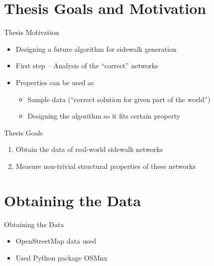 \documentclass{beamer}
\author[\FirstNameAbbreviated. \LastName]{\FirstName{} \LastName{} \\{\small \Supervisor}}
\title{\DissertationTitle}
\institute[\FacultyAndUniversityAbbr]{\Department\\ \Faculty\\ \University\\}
\date{June 26, 2024}
\begin{document}
\begin{frame}
\titlepage
\end{frame}

\section{Thesis Goals and Motivation}
\begin{frame}{Thesis Motivation}

\begin{itemize}
    \item Designing a future algorithm for sidewalk generation
    \item First step – Analysis of the “correct” networks
    \item Properties can be used as
    \begin{itemize} 
        \item Sample data (“correct solution for given part of the world”)
        \item Designing the algorithm so it fits certain property
    \end{itemize}
\end{itemize}


\end{frame}
\begin{frame}{Thesis Goals}

\begin{enumerate}
    \item Obtain the data of real-world sidewalk networks
    \item Measure non-trivial structural properties of these networks 
\end{enumerate}

\end{frame}

\section{Obtaining the Data}
\begin{frame}[fragile]{Obtaining the Data}
    \begin{itemize}
        \item OpenStreetMap data used
        \item Used Python package OSMnx
    \end{itemize}
\end{frame}
\end{document}
